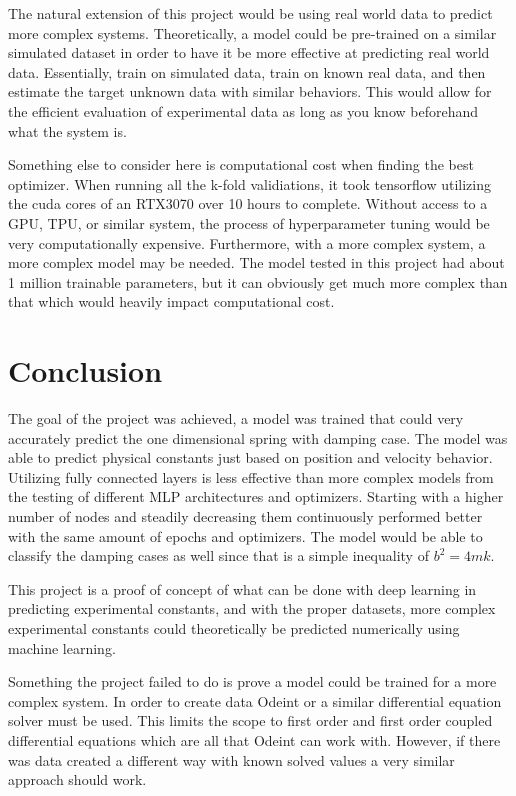 \documentclass[12pt]{article}
\begin{document}
	The natural extension of this project would be using real world data to predict more complex systems. Theoretically, a model could be pre-trained on a similar simulated dataset in order to have it be more effective at predicting real world data. Essentially, train on simulated data, train on known real data, and then estimate the target unknown data with similar behaviors. This would allow for the efficient evaluation of experimental data as long as you know beforehand what the system is.

	Something else to consider here is computational cost when finding the best optimizer. When running all the k-fold validiations, it took tensorflow utilizing the cuda cores of an RTX3070 over 10 hours to complete. Without access to a GPU, TPU, or similar system, the process of hyperparameter tuning would be very computationally expensive. Furthermore, with a more complex system, a more complex model may be needed. The model tested in this project had about 1 million trainable parameters, but it can obviously get much more complex than that which would heavily impact computational cost.

	\section*{Conclusion}

	The goal of the project was achieved, a model was trained that could very accurately predict the one dimensional spring with damping case. The model was able to predict physical constants just based on position and velocity behavior. Utilizing fully connected layers is less effective than more complex models from the testing of different MLP architectures and optimizers. Starting with a higher number of nodes and steadily decreasing them continuously performed better with the same amount of epochs and optimizers. The model would be able to classify the damping cases as well since that is a simple inequality of $b^2=4mk$.

	This project is a proof of concept of what can be done with deep learning in predicting experimental constants, and with the proper datasets, more complex experimental constants could theoretically be predicted numerically using machine learning.

	Something the project failed to do is prove a model could be trained for a more complex system. In order to create data Odeint or a similar differential equation solver must be used. This limits the scope to first order and first order coupled differential equations which are all that Odeint can work with. However, if there was data created a different way with known solved values a very similar approach should work.
\end{document}

